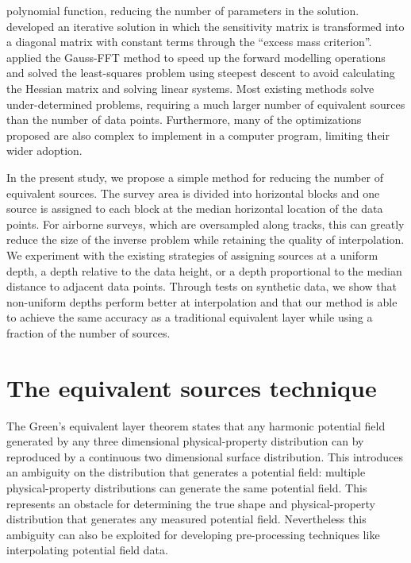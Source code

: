 \documentclass[twocolumn]{article}
\begin{document}
polynomial function, reducing the number of parameters in the solution.
\citet{siqueira2017} developed an iterative solution in which the sensitivity
matrix is transformed into a diagonal matrix with constant terms through the
``excess mass criterion''.
\citet{jirigalatu2019} applied the Gauss-FFT method to speed up the forward
modelling operations and solved the least-squares problem using steepest
descent to avoid calculating the Hessian matrix and solving linear systems.
Most existing methods solve under-determined problems, requiring a much larger
number of equivalent sources than the number of data points.
Furthermore, many of the optimizations proposed are also complex to implement
in a computer program, limiting their wider adoption.

In the present study,
we propose a simple method for reducing the number of equivalent sources.
The survey area is divided into horizontal blocks and one source is assigned
to each block at the median horizontal location of the data points.
For airborne surveys, which are oversampled along tracks, this can greatly
reduce the size of the inverse problem while retaining the quality of
interpolation.
We experiment with the existing strategies of assigning sources at
a uniform depth, a depth relative to the data height, or a depth proportional
to the median distance to adjacent data points.
Through tests on synthetic data, we show that non-uniform depths perform better
at interpolation and that our method is able to achieve the same accuracy as a
traditional equivalent layer while using a fraction of the number of sources.


\section{The equivalent sources technique}

The Green's equivalent layer theorem states that any harmonic potential field
generated by any three dimensional physical-property distribution can by
reproduced by a continuous two dimensional surface distribution.
This introduces an ambiguity on the distribution that generates
a potential field: multiple physical-property distributions can generate the
same potential field.
This represents an obstacle for determining the true shape and
physical-property distribution that generates any measured potential field.
Nevertheless this ambiguity can also be exploited for developing pre-processing
techniques like interpolating potential field data.
\end{document}
